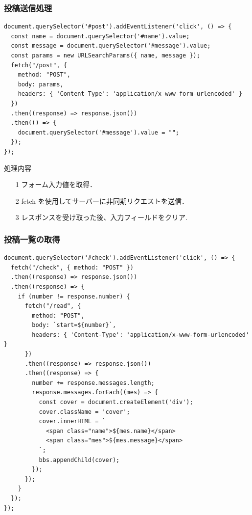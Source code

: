 \documentclass[uplatex,dvipdfmx]{jsarticle}
\begin{document}
\subsubsection{投稿送信処理}
\begin{lstlisting}[label=i]
document.querySelector('#post').addEventListener('click', () => {
  const name = document.querySelector('#name').value;
  const message = document.querySelector('#message').value;
  const params = new URLSearchParams({ name, message });
  fetch("/post", {
    method: "POST",
    body: params,
    headers: { 'Content-Type': 'application/x-www-form-urlencoded' }
  })
  .then((response) => response.json())
  .then(() => {
    document.querySelector('#message').value = "";
  });
});
\end{lstlisting}

\begin{itembox}[c]{処理内容}
    \begin{enumerate}
        \setlength{\leftskip}{0pt}
        \item[1]フォーム入力値を取得．
        \item[2]fetch を使用してサーバーに非同期リクエストを送信．
        \item[3]レスポンスを受け取った後、入力フィールドをクリア.
    \end{enumerate}
\end{itembox}


\subsubsection{投稿一覧の取得}
\begin{lstlisting}[label=j]
document.querySelector('#check').addEventListener('click', () => {
  fetch("/check", { method: "POST" })
  .then((response) => response.json())
  .then((response) => {
    if (number != response.number) {
      fetch("/read", {
        method: "POST",
        body: `start=${number}`,
        headers: { 'Content-Type': 'application/x-www-form-urlencoded' }
      })
      .then((response) => response.json())
      .then((response) => {
        number += response.messages.length;
        response.messages.forEach((mes) => {
          const cover = document.createElement('div');
          cover.className = 'cover';
          cover.innerHTML = `
            <span class="name">${mes.name}</span>
            <span class="mes">${mes.message}</span>
          `;
          bbs.appendChild(cover);
        });
      });
    }
  });
});
\end{lstlisting}
\end{document}
